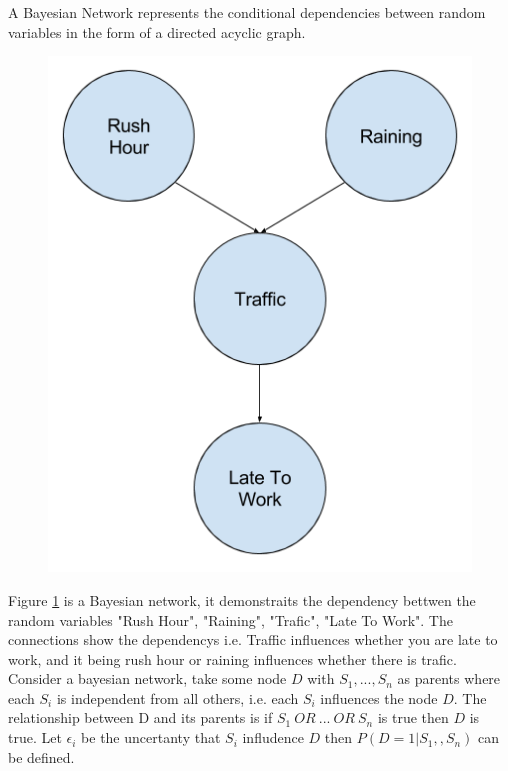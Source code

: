 A Bayesian Network represents the conditional dependencies between random variables in the form of a directed acyclic graph.

\begin{figure}[H]
  \centering
  \begin{minipage}[b]{0.4\textwidth}
    \includegraphics[width=\textwidth]{bayesian-network-example.png}
    \caption{}
    \label{fig:bayesian-network-example}
  \end{minipage}
  \hfill
\end{figure}

Figure \ref{fig:bayesian-network-example} is a Bayesian network, it demonstraits the dependency bettwen the random variables "Rush Hour", "Raining", "Trafic", "Late To Work". The connections show the dependencys i.e. Traffic influences whether you are late to work, and it being rush hour or raining influences whether there is trafic.\\

Consider a bayesian network, take some node $D$ with $S_1,..., S_n$ as parents where each $S_i$ is independent from all others, i.e. each $S_i$ influences the node $D$. The relationship between D and its parents is if $S_1\ OR\ ...\ OR\ S_n$ is true then $D$ is true. Let $\epsilon_i$ be the uncertanty that $S_i$ infludence $D$ then $P(D = 1| S_1, , S_n)$ can be defined.

